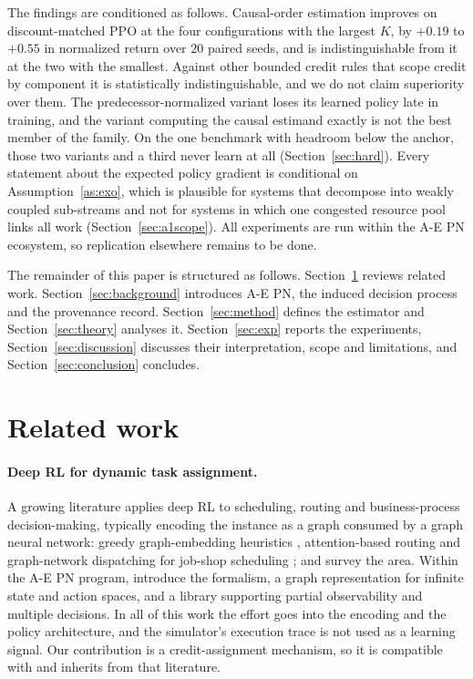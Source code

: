 \documentclass[review,authoryear,3p,times]{elsarticle}
\begin{document}
The findings are conditioned as follows. Causal-order estimation improves on
discount-matched PPO at the four configurations with the largest $K$, by
$+0.19$ to $+0.55$ in normalized return over $20$ paired seeds, and is
indistinguishable from it at the two with the smallest. Against other bounded
credit rules that scope credit by component it is statistically
indistinguishable, and we do not claim superiority over them. The
predecessor-normalized variant loses its learned policy late in training, and
the variant computing the causal estimand exactly is not the best member of the
family. On the one benchmark with headroom below the anchor, those two variants
and a third never learn at all (Section~\ref{sec:hard}). Every statement about
the expected policy gradient is conditional on Assumption~\ref{as:exo}, which
is plausible for systems that decompose into weakly coupled sub-streams and not
for systems in which one congested resource pool links all work
(Section~\ref{sec:a1scope}). All experiments are run within the A-E PN
ecosystem, so replication elsewhere remains to be done.

The remainder of this paper is structured as follows. Section~\ref{sec:related}
reviews related work. Section~\ref{sec:background} introduces A-E PN, the
induced decision process and the provenance record. Section~\ref{sec:method}
defines the estimator and Section~\ref{sec:theory} analyses it.
Section~\ref{sec:exp} reports the experiments, Section~\ref{sec:discussion}
discusses their interpretation, scope and limitations, and
Section~\ref{sec:conclusion} concludes.

\section{Related work}
\label{sec:related}

\paragraph{Deep RL for dynamic task assignment.} A growing literature applies
deep RL to scheduling, routing and business-process decision-making, typically
encoding the instance as a graph consumed by a graph neural network: greedy
graph-embedding heuristics \citep{khalil2017learning}, attention-based routing
\citep{nazari2018vrp} and graph-network dispatching for job-shop scheduling
\citep{zhang2020jobshop}; \citet{mazyavkina2021survey} and
\citet{bengio2021tour} survey the area. Within the A-E PN program,
\citet{aepn2023} introduce the formalism, \citet{aepn_repr2025} a graph
representation for infinite state and action spaces, and \citet{gympn2025} a
library supporting partial observability and multiple decisions. In all of this
work the effort goes into the encoding and the policy architecture, and the
simulator's execution trace is not used as a learning signal. Our contribution
is a credit-assignment mechanism, so it is compatible with and inherits from
that literature.
\end{document}
